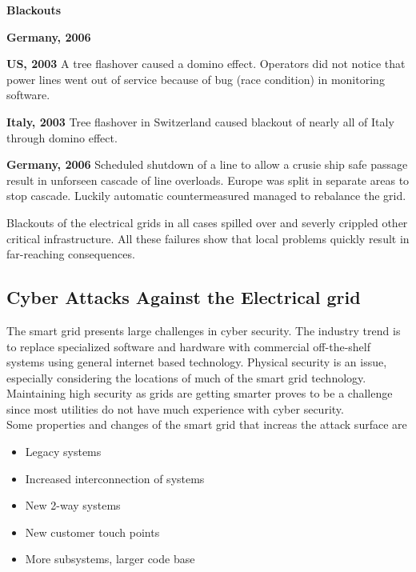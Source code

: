\begin{tcolorbox}
    \textbf{Blackouts}
    \begin{labeling}{\textbf{Germany, 2006}}
    \item [\textbf{US, 2003}]
        A tree flashover caused a domino effect.
        Operators did not notice that power lines went out of service because of bug (race condition) in monitoring software.
    \item [\textbf{Italy, 2003}]
        Tree flashover in Switzerland caused blackout of nearly all of Italy through domino effect.
    \item [\textbf{Germany, 2006}]
    Scheduled shutdown of a line to allow a crusie ship safe passage result in unforseen cascade of line overloads.
        Europe was split in separate areas to stop cascade.
        Luckily automatic countermeasured managed to rebalance the grid.
    \end{labeling}

Blackouts of the electrical grids in all cases spilled over and severly crippled other critical infrastructure.
All these failures show that local problems quickly result in far-reaching consequences.
\end{tcolorbox}

\subsection{Cyber Attacks Against the Electrical grid}
The smart grid presents large challenges in cyber security.
The industry trend is to replace specialized software and hardware with commercial off-the-shelf systems using general internet based technology.
Physical security is an issue, especially considering the locations of much of the smart grid technology.
Maintaining high security as grids are getting smarter proves to be a challenge since most utilities do not have much experience with cyber security.\\

Some properties and changes of the smart grid that increas the attack surface are
\begin{itemize}
    \item Legacy systems
    \item Increased interconnection of systems
    \item New 2-way systems
    \item New customer touch points
    \item More subsystems, larger code base
\end{itemize}

